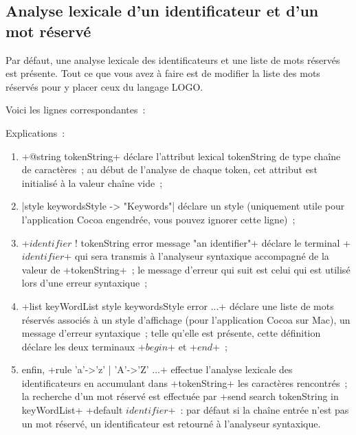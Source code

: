 \subsection{Analyse lexicale d'un identificateur et d'un mot réservé}

Par défaut, une analyse lexicale des identificateurs et une liste de mots réservés est présente. Tout ce que vous avez à faire est de modifier la liste des mots réservés pour y placer ceux du langage LOGO.

Voici les lignes correspondantes~:


Explications~:
\begin{enumerate}
  \item \ggsq+@string tokenString+ déclare l’attribut lexical tokenString de type chaîne de caractères~; au début de l’analyse de chaque token, cet attribut est initialisé à la valeur chaîne vide~;
  \item \ggsq|style keywordsStyle -> "Keywords"| déclare un style (uniquement utile pour l’application Cocoa engendrée, vous pouvez ignorer cette ligne)~;
  \item \ggsq+$identifier$ ! tokenString error message "an identifier"+ déclare le terminal \ggsq+$identifier$+ qui sera transmis à l’analyseur syntaxique accompagné de la valeur de \ggsq+tokenString+~; le message d’erreur qui suit est celui qui est utilisé lors d’une erreur syntaxique~;
  \item \ggsq+list keyWordList style keywordsStyle error ...+ déclare une liste de mots réservés associés à un style d’affichage (pour l’application Cocoa sur Mac), un message d’erreur syntaxique~; telle qu’elle est présente, cette définition déclare les deux terminaux \ggsq+$begin$+ et \ggsq+$end$+~;
  \item enfin, \ggsq+rule 'a'->'z' | 'A'->'Z' ...+ effectue l’analyse lexicale des identificateurs en accumulant dans \ggsq+tokenString+ les caractères rencontrés~; la recherche d'un mot réservé est effectuée par \ggsq+send search tokenString in keyWordList+ \ggsq+default $identifier$+~: par défaut si la chaîne entrée n'est pas un mot réservé, un identificateur est retourné à l’analyseur syntaxique.
\end{enumerate}

